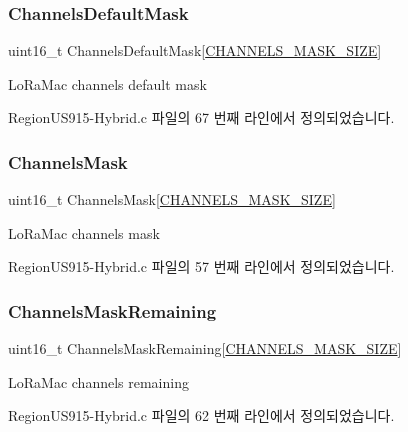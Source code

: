 \subsubsection{\texorpdfstring{Channels\+Default\+Mask}{ChannelsDefaultMask}}
{\footnotesize\ttfamily uint16\+\_\+t Channels\+Default\+Mask\mbox{[}\mbox{\hyperlink{_region_u_s915-_hybrid_8c_a1b20a8de3ae59c0b063fb313f0c70890}{C\+H\+A\+N\+N\+E\+L\+S\+\_\+\+M\+A\+S\+K\+\_\+\+S\+I\+ZE}}\mbox{]}\hspace{0.3cm}{\ttfamily [static]}}

Lo\+Ra\+Mac channels default mask 

Region\+U\+S915-\/\+Hybrid.\+c 파일의 67 번째 라인에서 정의되었습니다.

\mbox{\label{_region_u_s915-_hybrid_8c_a2188957b5ca6af8092154d7ccbfa5757}} 
\subsubsection{\texorpdfstring{Channels\+Mask}{ChannelsMask}}
{\footnotesize\ttfamily uint16\+\_\+t Channels\+Mask\mbox{[}\mbox{\hyperlink{_region_u_s915-_hybrid_8c_a1b20a8de3ae59c0b063fb313f0c70890}{C\+H\+A\+N\+N\+E\+L\+S\+\_\+\+M\+A\+S\+K\+\_\+\+S\+I\+ZE}}\mbox{]}\hspace{0.3cm}{\ttfamily [static]}}

Lo\+Ra\+Mac channels mask 

Region\+U\+S915-\/\+Hybrid.\+c 파일의 57 번째 라인에서 정의되었습니다.

\mbox{\label{_region_u_s915-_hybrid_8c_a567333cec639a004655cc1717e9d0928}} 
\subsubsection{\texorpdfstring{Channels\+Mask\+Remaining}{ChannelsMaskRemaining}}
{\footnotesize\ttfamily uint16\+\_\+t Channels\+Mask\+Remaining\mbox{[}\mbox{\hyperlink{_region_u_s915-_hybrid_8c_a1b20a8de3ae59c0b063fb313f0c70890}{C\+H\+A\+N\+N\+E\+L\+S\+\_\+\+M\+A\+S\+K\+\_\+\+S\+I\+ZE}}\mbox{]}\hspace{0.3cm}{\ttfamily [static]}}

Lo\+Ra\+Mac channels remaining 

Region\+U\+S915-\/\+Hybrid.\+c 파일의 62 번째 라인에서 정의되었습니다.

